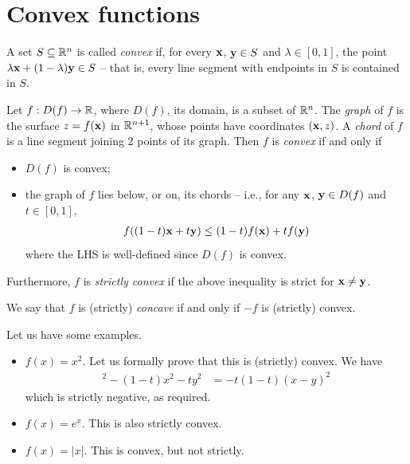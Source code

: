 \documentclass{../template/note}
\begin{document}
    \section{Convex functions}
    
    \begin{definition}
        A set $S \subseteq \mathbb R^n$ is called \emph{convex} if, for every $\V x$, $\V y \in S$ and $\lambda \in [0, 1]$, the point $\lambda \V x + (1-\lambda)\V y \in S$ -- that is, every line segment with endpoints in $S$ is contained in $S$.
    \end{definition}
    
    \begin{definition}
        Let $f: D(f) \to \mathbb R$, where $D(f)$, its domain, is a subset of $\mathbb R^n$. The \emph{graph} of $f$ is the surface $z = f(\V x)$ in $\mathbb R^{n+1}$, whose points have coordinates $(\V x, z)$. A \emph{chord} of $f$ is a line segment joining 2 points of its graph. Then $f$ is \emph{convex} if and only if
        \begin{itemize}
            \item $D(f)$ is convex;
            \item the graph of $f$ lies below, or on, its chords -- i.e., for any $\V x$, $\V y \in D(f)$ and $t \in [0, 1]$,
            \begin{align*}
                f((1-t)\V x + t\V y) \leq (1-t)f(\V x) + tf(\V y)
            \end{align*}
            where the LHS is well-defined since $D(f)$ is convex.            
        \end{itemize}
        Furthermore, $f$ is \emph{strictly convex} if the above inequality is strict for $\V x \neq \V y$.
    \end{definition}
    
    \begin{definition}[Concavity]
        We say that $f$ is (strictly) \emph{concave} if and only if $-f$ is (strictly) convex.
    \end{definition}
    
    \begin{example*}
        Let us have some examples.
        \begin{itemize}
            \item $f(x) = x^2$. Let us formally prove that this is (strictly) convex. We have
            \begin{align*}
                [(1-t)x + ty]^2 - (1-t)x^2 - ty^2 &= -t(1-t)(x-y)^2
            \end{align*}
            which is strictly negative, as required.
            \item $f(x) = e^x$. This is also strictly convex.
            \item $f(x) = |x|$. This is convex, but not strictly.
        \end{itemize}
    \end{example*}
    
\end{document}
